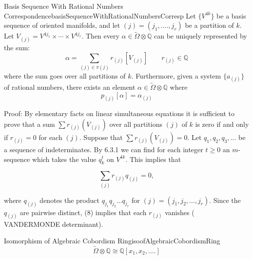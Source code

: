 \documentclass{book}
\newcommand{\Q}{{\mathbb{Q}}}
\begin{document}
\begin{thm}{Basis Sequence With Rational Numbers Correspondence}{basisSequenceWithRationalNumbersCorresp}
  Let $\{V^{4k}\}$ be a basis sequence of oriented manifolds, and let $(j) = (j_1, ...., j_r)$ be a partition
  of $k$. Let $V_{(j)} = V^{4j_1}\times \cdots \times V^{4j_r}$. Then every $\alpha \in
  \widetilde{\Omega}\otimes \Q$ can be uniquely represented by the sum:
  \[
    \alpha = \sum_{(j) \in \pi(j)} r_{(j)}[V_{(j)}] \qquad r_{(j)} \in \Q
  \]
  where the sum goes over all partitions of $k$. Furthermore, given a system $\{a_{(j)}\}$ of rational
  numbers, there exists an element $\alpha \in \widetilde{\Omega}\otimes \Q$ where
  \[
    p_{(j)}[\alpha] = \alpha_{(j)}
  \]
\end{thm}
\begin{Proof}
  Proof: By elementary facts on linear simultaneous equations it is sufficient to prove that a sum $\sum r_{(j)}(V_{(j)})$ over all partitions $(j)$ of $k$ is zero if and only if $r_{(j)} = 0$ for each $(j)$. Suppose that $\sum r_{(j)}(V_{(j)}) = 0$. Let $q_1, q_2, q_3, \ldots$ be a sequence of indeterminates. By {\color{red} 6.3.1} we can find for each integer $t \geq 0$ an $m$-sequence which takes the value $q_k^t$ on $V^{4k}$. This implies that

\[
    \sum_{(j)} r_{(j)} q_{(j)} = 0,
\]

where $q_{(j)}$ denotes the product $q_{j_1} q_{j_2} \ldots q_{j_r}$ for $(j) = (j_1, j_2, \ldots, j_r)$. Since the $q_{(j)}$ are pairwise distinct, (8) implies that each $r_{(j)}$ vanishes ({\color{red} VANDERMONDE} determinant).
\end{Proof}




\begin{thm}{Isomorphism of Algebraic Cobordism Ring}{isoofAlgebraicCobordismRing}
  \[
    \widetilde{\Omega}\otimes \Q \cong \Q[x_1, x_2, ....]
  \]
\end{thm}
\end{document}
